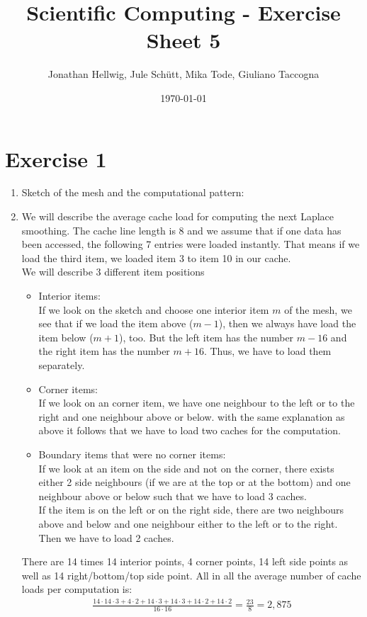 \documentclass{article}
\title{Scientific Computing - Exercise Sheet 5}
\author{Jonathan Hellwig, Jule Schütt, Mika Tode, Giuliano Taccogna}
\date{\today}
\begin{document}
\maketitle

\section{Exercise 1}
\begin{enumerate}[label=(\alph*)]
    \item Sketch of the mesh and the computational pattern:
    \newpage
    
    \item
    We will describe the average cache load for computing the next Laplace smoothing. The cache line length is 8 and we assume that if one data has been accessed, the following 7 entries were loaded instantly. That means if we load the third item, we loaded item 3 to item 10 in our cache. \\
    We will describe 3 different item positions
    \begin{itemize}
        \item Interior items:\\
    If we look on the sketch and choose one interior item $m$ of the mesh, we see that if we load the item above ($m-1$), then we always have load the item below ($m+1$), too. But the left item has the number $m-16$ and the right item has the number $m+16$. Thus, we have to load them separately. 
    \item Corner items:\\
    If we look on an corner item, we have one neighbour to the left or to the right and one neighbour above or below. with the same explanation as above it follows that we have to load two caches for the computation.
    
    \item Boundary items that were no corner items:\\
    If we look at an item on the side and not on the corner, there exists either 2 side neighbours (if we are at the top or at the bottom) and one neighbour above or below such that we have to load 3 caches.
    \\
    If the item is on the left or on the right side, there are two neighbours above and below and one neighbour either to the left or to the right. Then we have to load 2 caches.
    \end{itemize}
    There are 14 times 14 interior points, 4 corner points, 14 left side points as well as 14 right/bottom/top side point. All in all the average number of cache loads per computation is:
    \begin{align*}
        \frac{14\cdot14\cdot3+4\cdot2+14\cdot3+14\cdot3+14\cdot2+14\cdot2}{16\cdot16}=\frac{23}{8} = 2,875
    \end{align*}


\end{enumerate}
\end{document}
